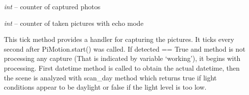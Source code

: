 \documentclass[letterpaper,10pt,english]{sphinxmanual}
\begin{document}
\begin{fulllineitems}
\begin{fulllineitems}
\end{fulllineitems}


\begin{fulllineitems}
\label{rpicameramon:rpicameramon.motion.CaptureHandler.i}
\emph{int} -- counter of captured photos

\end{fulllineitems}


\begin{fulllineitems}
\label{rpicameramon:rpicameramon.motion.CaptureHandler.echoCounter}
\emph{int} -- counter of taken pictures with echo mode

\end{fulllineitems}


\begin{fulllineitems}
\label{rpicameramon:rpicameramon.motion.CaptureHandler.motion_detected}
\end{fulllineitems}


\begin{fulllineitems}
\label{rpicameramon:rpicameramon.motion.CaptureHandler.scan_day}
\end{fulllineitems}


\begin{fulllineitems}
\label{rpicameramon:rpicameramon.motion.CaptureHandler.tick}
This tick method provides a handler for capturing the pictures.
It ticks every second after PiMotion.start() was called.
If detected == True and method is not processing any capture
(That is indicated by variable `working'), it begins with processing.
First datetime method is called to obtain the actual datetime, then
the scene is analyzed with scan\_day method which returns true if
light conditions appear to be daylight or false if the light level
is too low.


\end{fulllineitems}
\end{fulllineitems}
\end{document}
